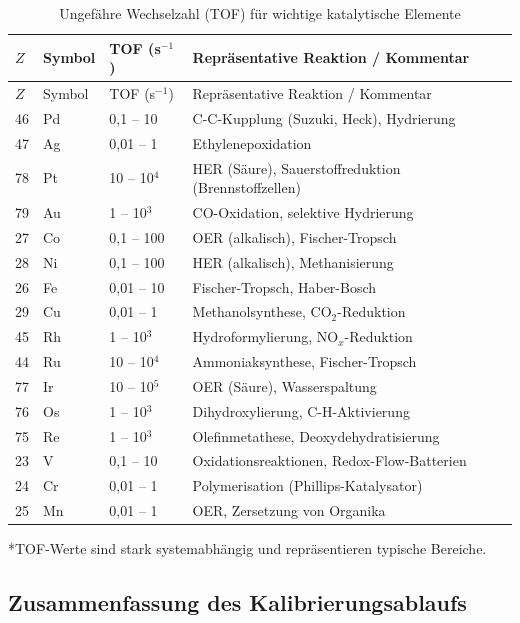 \documentclass[12pt,a4paper]{article}
\begin{document}
\begin{longtable}{p{1.2cm}p{1.2cm}p{3.0cm}p{6.5cm}}
	\caption{Ungefähre Wechselzahl (TOF) für wichtige katalytische Elemente} \label{tab:tof-data} \\
	\toprule
	\(Z\) & Symbol & TOF (s\(^{-1}\)) & Repräsentative Reaktion / Kommentar \\
	\midrule
	\endfirsthead
	\toprule
	\(Z\) & Symbol & TOF (s\(^{-1}\)) & Repräsentative Reaktion / Kommentar \\
	\midrule
	\endhead
	46 & Pd & 0,1 – 10 & C-C-Kupplung (Suzuki, Heck), Hydrierung \\
	47 & Ag & 0,01 – 1 & Ethylenepoxidation \\
	78 & Pt & 10 – 10\(^4\) & HER (Säure), Sauerstoffreduktion (Brennstoffzellen) \\
	79 & Au & 1 – 10\(^3\) & CO-Oxidation, selektive Hydrierung \\
	27 & Co & 0,1 – 100 & OER (alkalisch), Fischer-Tropsch \\
	28 & Ni & 0,1 – 100 & HER (alkalisch), Methanisierung \\
	26 & Fe & 0,01 – 10 & Fischer-Tropsch, Haber-Bosch \\
	29 & Cu & 0,01 – 1 & Methanolsynthese, CO\(_2\)-Reduktion \\
	45 & Rh & 1 – 10\(^3\) & Hydroformylierung, NO\(_x\)-Reduktion \\
	44 & Ru & 10 – 10\(^4\) & Ammoniaksynthese, Fischer-Tropsch \\
	77 & Ir & 10 – 10\(^5\) & OER (Säure), Wasserspaltung \\
	76 & Os & 1 – 10\(^3\) & Dihydroxylierung, C-H-Aktivierung \\
	75 & Re & 1 – 10\(^3\) & Olefinmetathese, Deoxydehydratisierung \\
	23 & V  & 0,1 – 10 & Oxidationsreaktionen, Redox-Flow-Batterien \\
	24 & Cr & 0,01 – 1 & Polymerisation (Phillips-Katalysator) \\
	25 & Mn & 0,01 – 1 & OER, Zersetzung von Organika \\
	\bottomrule
\end{longtable}
*TOF-Werte sind stark systemabhängig und repräsentieren typische Bereiche.

\subsection{Zusammenfassung des Kalibrierungsablaufs}
\end{document}
